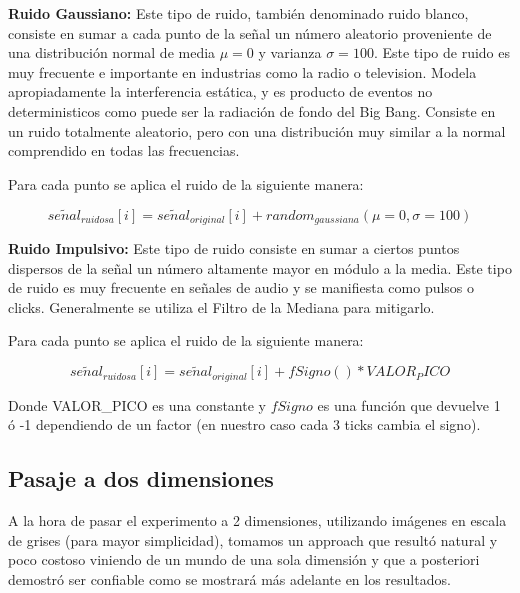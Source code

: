 \begin{itemize}

	\begin{item}
		{\bf Ruido Gaussiano:} Este tipo de ruido, tambi\'en denominado ruido
blanco, consiste en sumar a cada punto de la se\~nal un n\'umero aleatorio
proveniente de una distribuci\'on normal de media $\mu = 0$ y varianza $\sigma=100$. 
Este tipo de ruido es muy frecuente e importante en industrias como la radio o television.
Modela apropiadamente la interferencia est\'atica, y es producto de eventos no deterministicos como 
puede ser la radiaci\'on de fondo del Big Bang. Consiste en un ruido totalmente aleatorio, pero con 
una distribuci\'on muy similar a la normal comprendido en todas las frecuencias.

 	Para cada punto se aplica el ruido de la siguiente manera:

    $$se\widetilde{n}al_{ruidosa}[i] = se\widetilde{n}al_{original}[i] + random_{gaussiana}(\mu=0, \sigma=100)$$


	\end{item}

	\begin{item}
		{\bf Ruido Impulsivo:} Este tipo de ruido consiste en sumar a ciertos puntos dispersos 
de la se\~nal un n\'umero altamente mayor en m\'odulo a la media. Este tipo de ruido es muy 
frecuente en se\~nales de audio y se manifiesta como pulsos o clicks.
Generalmente se utiliza el Filtro de la Mediana para mitigarlo.

 	Para cada punto se aplica el ruido de la siguiente manera:

    $$se\widetilde{n}al_{ruidosa}[i] = se\widetilde{n}al_{original}[i] + fSigno() * VALOR_PICO$$

	Donde VALOR\_PICO es una constante y $fSigno$ es una funci\'on que devuelve 1 \'o -1 dependiendo
	de un factor (en nuestro caso cada 3 ticks cambia el signo).

	\end{item}

\end{itemize}

\subsection{Pasaje a dos dimensiones}

A la hora de pasar el experimento a 2 dimensiones, utilizando im\'agenes en
escala de grises (para mayor simplicidad), tomamos un approach que result\'o
natural y poco costoso viniendo de un mundo de una sola dimensi\'on y que a
posteriori demostr\'o ser confiable como se mostrar\'a m\'as adelante en los
resultados.

